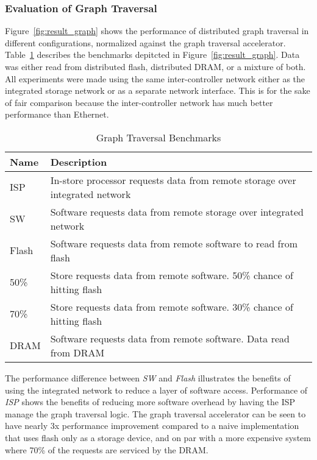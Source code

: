 \subsubsection{Evaluation of Graph Traversal}

Figure~\ref{fig:result_graph} shows the performance of distributed graph traversal in
different configurations, normalized against the graph traversal
accelerator. Table~\ref{tab:graph} describes the benchmarks depitcted in
Figure~\ref{fig:result_graph}. Data was either read from distributed flash,
distributed DRAM, or a mixture of both. All experiments were made using the same
inter-controller network either as the integrated storage network or as a
separate network interface. This is for the sake of fair comparison because  the
inter-controller network has much better performance than Ethernet.

\begin{table}[h]\footnotesize
\begin{tabular}{l | p{0.25\paperwidth}}
\arraystretch{0.9}
Name & Description \\
\hline \hline
ISP & In-store processor requests data from remote storage over integrated network \\
SW & Software requests data from remote storage over integrated network \\
Flash & Software requests data from remote software to read from flash \\
50\% & Store requests data from remote software. 50\% chance of hitting flash \\
70\% & Store requests data from remote software. 30\% chance of hitting flash \\
DRAM & Software requests data from remote software. Data read from DRAM \\
\hline
\end{tabular}
\caption{Graph Traversal Benchmarks}
\label{tab:graph}
\end{table}

The performance difference between \emph{SW} and \emph{Flash} illustrates the
benefits of using the integrated network to reduce a layer of software access.
Performance of \emph{ISP} shows the benefits of reducing more software overhead
by having the ISP manage the graph traversal logic. 
The graph traversal accelerator can be seen to have nearly 3x
performance improvement compared to a naive implementation that uses flash only
as a storage device, and on par with a more expensive system where 70\% of the requests are
serviced by the DRAM.

